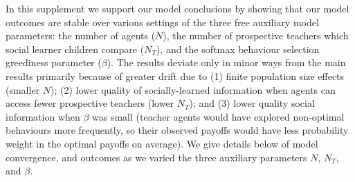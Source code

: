 \documentclass[letterpaper,11.5pt]{scrartcl}
\newcommand{\ps}[1]{{\textcolor{mygreen} {({\tiny PS:} #1)}}}
\begin{document}





In this supplement we support our model conclusions by showing that our model
outcomes are stable over various settings of the three free auxiliary model
parameters: the number of agents ($N$), the number of
prospective teachers which social learner children compare
($N_T$), and the softmax behaviour selection greediness parameter ($\beta$).
The results deviate only in minor ways from the main results primarily because of greater drift
due to (1) finite population size effects (smaller $N$);
(2) lower quality of socially-learned information when agents can access fewer
prospective teachers (lower $N_T$); and (3) lower quality social information when $\beta$
was small (teacher agents would have explored non-optimal behaviours more
frequently, so their observed payoffs would have less probability weight in
the optimal payoffs on average). We give details below of model convergence, and
outcomes as we varied the three auxiliary parameters $N$, $N_T$, and $\beta$.


\clearpage
\end{document}
